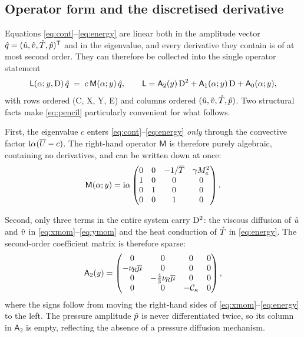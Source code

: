 \documentclass[11pt]{article}
\begin{document}
\subsection{Operator form and the discretised derivative}\label{sec:operator}
Equations \eqref{eq:cont}--\eqref{eq:energy} are linear both in the amplitude vector
$\hat{q}=(\hat{u},\hat{v},\hat{T},\hat{p})^{\mathsf T}$ and in the eigenvalue, and every derivative they contain
is of at most second order. They can therefore be collected into the single operator statement
\begin{equation}\label{eq:pencil}
  \mathsf L(\alpha;y,\mathrm{D})\,\hat{q} \;=\; c\,\mathsf M(\alpha;y)\,\hat{q},
  \qquad
  \mathsf L=\mathsf A_2(y)\,\mathrm{D}^2+\mathsf A_1(\alpha;y)\,\mathrm{D}+\mathsf A_0(\alpha;y),
\end{equation}
with rows ordered (C, X, Y, E) and columns ordered $(\hat{u},\hat{v},\hat{T},\hat{p})$. Two structural facts
make \eqref{eq:pencil} particularly convenient for what follows.

First, the eigenvalue $c$ enters \eqref{eq:cont}--\eqref{eq:energy} \emph{only} through the convective
factor $\mathrm{i}\alpha(\overline{U}-c)$. The right-hand operator $\mathsf M$ is therefore purely algebraic,
containing no derivatives, and can be written down at once:
\begin{equation}\label{eq:Mmat}
  \mathsf M(\alpha;y)=\mathrm{i}\alpha
  \begin{pmatrix}
    0 & 0 & -1/\overline{T} & \gamma M_e^2\\
    1 & 0 & 0 & 0\\
    0 & 1 & 0 & 0\\
    0 & 0 & 1 & 0
  \end{pmatrix}.
\end{equation}

Second, only three terms in the entire system carry $\mathrm{D}^2$: the viscous diffusion of $\hat{u}$ and
$\hat{v}$ in \eqref{eq:xmom}--\eqref{eq:ymom} and the heat conduction of $\hat{T}$ in \eqref{eq:energy}.
The second-order coefficient matrix is therefore sparse:
\begin{equation}\label{eq:A2mat}
  \mathsf A_2(y)=
  \begin{pmatrix}
    0 & 0 & 0 & 0\\
    -\nu_{\!R}\overline{\mu} & 0 & 0 & 0\\
    0 & -\tfrac43\nu_{\!R}\overline{\mu} & 0 & 0\\
    0 & 0 & -\mathcal C_\kappa & 0
  \end{pmatrix},
\end{equation}
where the signs follow from moving the right-hand sides of \eqref{eq:xmom}--\eqref{eq:energy} to the
left. The pressure amplitude $\hat{p}$ is never differentiated twice, so its column in $\mathsf A_2$ is
empty, reflecting the absence of a pressure diffusion mechanism.
\end{document}

